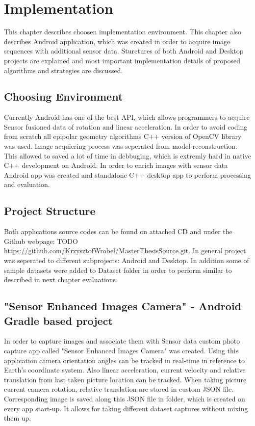 \ifpdf
    \graphicspath{{figures/}{figures/comparisons}}
\else
    \graphicspath{{figures/}{figures/comparisons}}
\fi

\chapter{Implementation} %
This chapter describes choosen implementation environment. This chapter also describes Android application, which was created in order to acquire image sequences with additional sensor data. Sturctures of both Android and Desktop projects are explained and most important implementation details of proposed algorithms and strategies are discussed.
\section{Choosing Environment}
Currently Android has one of the best API, which allows programmers to acquire Sensor fusioned data of rotation and linear acceleration.
In order to avoid coding from scratch all epipolar geometry algorithms C++ version of OpenCV library was used. Image acquiering process was seperated from model reconstruction. This allowed to saved a lot of time in debbuging, which is extremly hard in native C++ development on Android. In order to enrich images with sensor data Android app was created and standalone C++ desktop app to perform processing and evaluation.
\section{Project Structure} \label{sec:ProjectStructure}
Both applications source codes can be found on attached CD and under the Github webpage: TODO \url{https://github.com/KrzysztofWrobel/MasterThesisSource.git}. In general project was seperated to different subprojects: Android and Desktop. In addition some of sample datasets were added to Dataset folder in order to perform similar to described in next chapter evaluations.
\section{"Sensor Enhanced Images Camera" - Android Gradle based project}
In order to capture images and associate them with Sensor data custom photo capture app called "Sensor Enhanced Images Camera" was created.
Using this application camera orientation angles can be tracked in real-time in reference to Earth's coordinate system. Also linear acceleration, current velocity and relative translation from last taken picture location can be tracked. 
When taking picture current camera rotation, relative translation are stored in custom JSON file. Corresponding image is saved along this JSON file in folder, which is created on every app start-up. It allows for taking different dataset captures without mixing them up.
